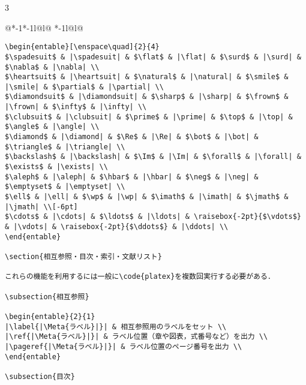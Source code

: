 \documentclass[10pt,a4paper,landscape,dvipdfmx,nomag]{jsarticle}
\makeatletter
\def\set@etsep#1#2{\def\etcolsep{#1}\def\etitemsep{#2}}
\newenvironment{entable}[3][\quad\qquad]{%
  \set@etsep#1\relax\relax
  \begin{tabular}{%
    @{}*{\the\numexpr#3-1}{*{\the\numexpr#2-1}{l@{\etcolsep}}l@{\etitemsep}}%
    *{\the\numexpr#2-1}{l@{\etcolsep}}l@{}}}{%
  \end{tabular}}
\newcommand*\eghostguarded{%
  \ifmmode \expandafter\@firstofone
  \else \expandafter\pxqgg@eghostguarded@a
  \fi}
\def\pxqgg@eghostguarded@a#1{%
  {\pxqgg@TI\pxqgg@cwm}%
  #1%
  {\pxqgg@TI\pxqgg@cwm}}
\newcommand{\codefont}{\ttfamily\gtfamily}
\newcommand{\code}[1]{\eghostguarded{{\codefont #1}}}
\newcommand{\Meta}[1]{$\langle$\mbox{}\emph{#1}\mbox{}$\rangle$}
\makeatother
\begin{document}
\begin{multicols}{3}
\begin{entable}[\enspace]{2}{1}
\begin{verbatim}
\begin{entable}[\enspace\quad]{2}{4}
$\spadesuit$ & |\spadesuit| & $\flat$ & |\flat| & $\surd$ & |\surd| & $\nabla$ & |\nabla| \\
$\heartsuit$ & |\heartsuit| & $\natural$ & |\natural| & $\smile$ & |\smile| & $\partial$ & |\partial| \\
$\diamondsuit$ & |\diamondsuit| & $\sharp$ & |\sharp| & $\frown$ & |\frown| & $\infty$ & |\infty| \\
$\clubsuit$ & |\clubsuit| & $\prime$ & |\prime| & $\top$ & |\top| & $\angle$ & |\angle| \\
$\diamond$ & |\diamond| & $\Re$ & |\Re| & $\bot$ & |\bot| & $\triangle$ & |\triangle| \\
$\backslash$ & |\backslash| & $\Im$ & |\Im| & $\forall$ & |\forall| & $\exists$ & |\exists| \\
$\aleph$ & |\aleph| & $\hbar$ & |\hbar| & $\neg$ & |\neg| & $\emptyset$ & |\emptyset| \\
$\ell$ & |\ell| & $\wp$ & |\wp| & $\imath$ & |\imath| & $\jmath$ & |\jmath| \\[-6pt]
$\cdots$ & |\cdots| & $\ldots$ & |\ldots| & \raisebox{-2pt}{$\vdots$} & |\vdots| & \raisebox{-2pt}{$\ddots$} & |\ddots| \\
\end{entable}

\section{相互参照・目次・索引・文献リスト}

これらの機能を利用するには一般に\code{platex}を複数回実行する必要がある．

\subsection{相互参照}

\begin{entable}{2}{1}
|\label{|\Meta{ラベル}|}| & 相互参照用のラベルをセット \\
|\ref{|\Meta{ラベル}|}| & ラベル位置（章や図表，式番号など）を出力 \\
|\pageref{|\Meta{ラベル}|}| & ラベル位置のページ番号を出力 \\
\end{entable}

\subsection{目次}


\end{verbatim}
\end{entable}
\end{multicols}
\end{document}
